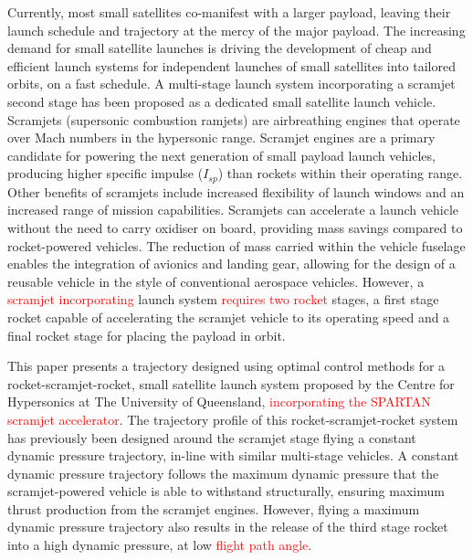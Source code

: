 \documentclass[journal]{new-aiaa}
\begin{document}
Currently, most small satellites co-manifest with a larger payload, leaving their launch schedule and trajectory at the mercy of the major payload. The  increasing demand for small satellite launches\cite{Faa&Ast&Comstac2015} is driving the development of cheap and efficient launch systems for independent launches of small satellites into tailored orbits, on a fast schedule. 
A multi-stage launch system incorporating a scramjet second stage has been proposed as a dedicated small satellite launch vehicle\cite{Smart2009a}. 
Scramjets (supersonic combustion ramjets) are airbreathing engines that operate over Mach numbers in the hypersonic  range\cite{HeiserWilliamPratt1994}. 
Scramjet engines are a primary candidate for powering the next generation of small payload launch vehicles, producing higher specific impulse ($I_{sp}$)  than rockets within their operating range. Other benefits of scramjets include increased flexibility of launch windows and an increased range of mission capabilities\cite{Flaherty2010}. 
Scramjets can accelerate a launch vehicle without the need to carry oxidiser on board, providing mass savings compared to rocket-powered vehicles. 
 The reduction of mass carried within the vehicle fuselage enables the integration of avionics and landing gear, allowing for the design of a reusable vehicle in the style of conventional aerospace vehicles. 
However, a \textcolor{red}{scramjet incorporating} launch system \textcolor{red}{requires two rocket} stages, a first stage rocket capable of accelerating the scramjet vehicle to its operating speed and a final rocket stage for placing the payload in orbit. 


This paper presents a trajectory designed using optimal control methods for a rocket-scramjet-rocket, small satellite launch system proposed by the Centre for Hypersonics at The University of Queensland\cite{Preller2017b}, \textcolor{red}{incorporating the SPARTAN scramjet accelerator}. 
The trajectory profile of this rocket-scramjet-rocket system has previously been designed around the scramjet stage flying a constant dynamic pressure trajectory\cite{Preller2017b}, in-line with similar multi-stage vehicles\cite{Kimura1999,Olds1998}.
 A constant dynamic pressure trajectory follows the maximum dynamic pressure that the scramjet-powered vehicle is able to withstand structurally, ensuring maximum thrust production from the scramjet engines. However, flying a maximum dynamic pressure trajectory also results in the release of the third stage rocket into a high dynamic pressure, at low \textcolor{red}{flight path angle}. 
\end{document}
